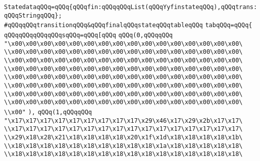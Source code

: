 \verb|StatedataqQQq=qQQq{qQQqfin:qQQqqQQqList(qQQqYyfinstateqQQq),qQQqtrans:qQQqStringqQQq};|\newline
\verb|#qQQqqQQqtransitionqQQq&qQQqfinalqQQqstateqQQqtableqQQq|\newline
\verb|tabqQQq=qQQq{|\newline
\verb|qQQqqQQqqQQqqQQqsqQQq=qQQq[qQQq|\newline
\verb|qQQq(0,qQQqqQQq|\newline
\verb|"\x00\x00\x00\x00\x00\x00\x00\x00\x00\x00\x00\x00\x00\x00\x00\x00\|\newline
\verb|\\x00\x00\x00\x00\x00\x00\x00\x00\x00\x00\x00\x00\x00\x00\x00\x00\|\newline
\verb|\\x00\x00\x00\x00\x00\x00\x00\x00\x00\x00\x00\x00\x00\x00\x00\x00\|\newline
\verb|\\x00\x00\x00\x00\x00\x00\x00\x00\x00\x00\x00\x00\x00\x00\x00\x00\|\newline
\verb|\\x00\x00\x00\x00\x00\x00\x00\x00\x00\x00\x00\x00\x00\x00\x00\x00\|\newline
\verb|\\x00\x00\x00\x00\x00\x00\x00\x00\x00\x00\x00\x00\x00\x00\x00\x00\|\newline
\verb|\\x00\x00\x00\x00\x00\x00\x00\x00\x00\x00\x00\x00\x00\x00\x00\x00\|\newline
\verb|\\x00\x00\x00\x00\x00\x00\x00\x00\x00\x00\x00\x00\x00\x00\x00\x00\|\newline
\verb|\\x00"|\newline
\verb|),|\newline
\verb|qQQq(1,qQQqqQQq|\newline
\verb|"\x17\x17\x17\x17\x17\x17\x17\x17\x17\x29\x46\x17\x29\x2b\x17\x17\|\newline
\verb|\\x17\x17\x17\x17\x17\x17\x17\x17\x17\x17\x17\x17\x17\x17\x17\x17\|\newline
\verb|\\x29\x18\x28\x21\x18\x18\x18\x18\x20\x1f\x1d\x18\x18\x18\x18\x1b\|\newline
\verb|\\x18\x18\x18\x18\x18\x18\x18\x18\x18\x18\x1a\x18\x18\x18\x18\x18\|\newline
\verb|\\x18\x18\x18\x18\x18\x18\x18\x18\x18\x18\x18\x18\x18\x18\x18\x18\|\newline
